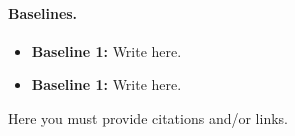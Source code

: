\documentclass[10pt]{article}
\begin{document}
\paragraph{Baselines.} 

\begin{itemize}

\item {\bf Baseline 1: } Write here. %

\item {\bf Baseline 1: } Write here. %

\end{itemize}

Here you must provide citations and/or links.



{\small


}
\end{document}
